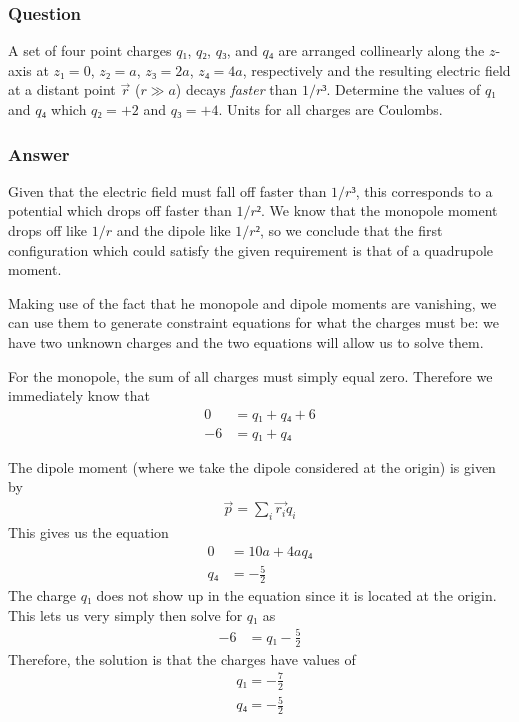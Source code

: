 \subsubsection{Question}

A set of four point charges $q₁$, $q₂$, $q₃$, and $q₄$ are arranged
collinearly along the $z$-axis at $z₁ = 0$, $z₂ = a$, $z₃ = 2a$, $z₄ = 4a$,
respectively and the resulting electric field at a distant point $\vec r$ ($r
≫ a$) decays \emph{faster} than $1/r³$. Determine the values of $q₁$ and $q₄$
which $q₂ = +2$ and $q₃ = +4$. Units for all charges are Coulombs.

\subsubsection{Answer}

Given that the electric field must fall off faster than $1/r³$, this
corresponds to a potential which drops off faster than $1/r²$. We know that
the monopole moment drops off like $1/r$ and the dipole like $1/r²$, so we
conclude that the first configuration which could satisfy the given
requirement is that of a quadrupole moment.

Making use of the fact that he monopole and dipole moments are vanishing, we
can use them to generate constraint equations for what the charges must be:
we have two unknown charges and the two equations will allow us to solve them.

For the monopole, the sum of all charges must simply equal zero. Therefore
we immediately know that
\begin{align*}
    0 &= q₁ + q₄ + 6 \\
    -6 &= q₁ + q₄
\end{align*}

The dipole moment (where we take the dipole considered at the origin) is given
by
\begin{align*}
    \vec p = \sum_i \vec{r_i} q_i
\end{align*}
This gives us the equation
\begin{align*}
    0 &= 10a + 4aq₄ \\
    q₄ &= -\frac 52
\end{align*}
The charge $q₁$ does not show up in the equation since it is located at the
origin. This lets us very simply then solve for $q₁$ as
\begin{align*}
    -6 &= q₁ - \frac 52
\end{align*}
Therefore, the solution is that the charges have values of
\begin{align}
    \boxed{ q₁ = -\frac 72 } \\
    \boxed{ q₄ = -\frac 52 }
\end{align}

